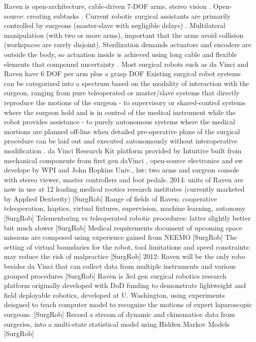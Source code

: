 Raven is open-architecture, cable-driven 7-DOF arms, stereo vision \citep{bib:raven_debride}.
Open-source: creating subtasks \citep{bib:raven_debride}.
Current robotic surgical assistants are primarily controlled by surgeons (master-slave with negligible delays) \citep{bib:raven_debride}.
Multilateral manipulation (with two or more arms), important that the arms avoid collision \citep{bib:raven_debride} (workspaces are rarely disjoint).
Sterilization demands actuators and encoders are outside the body, so actuation inside is achieved using long cable and flexible elements that compound uncertainty \citep{bib:raven_debride}.
Most surgical robots such as da Vinci and Raven have 6 DOF per arm plus a grasp DOF \citep{bib:raven_debride}
Existing surgical robot systems can be categorized into a spectrum based on the modality of interaction with the surgeon, ranging from pure teleoperated or master/slave systems that directly reproduce the motions of the surgeon - to supervisory or shared-control systems where the surgeon hold and is in control of the medical instrument while the robot provides assistance - to purely autonomous systems where the medical mortions are planned off-line when detailed pre-operative plans of the surgical procedure can be laid out and executed autonomously without interoperative modification \citep{bib:raven_debride}.
da Vinci Research Kit platform provided by Intuitive built from mechanical components from first gen daVinci \citep{bib:raven_observ}, open-source electronics and sw develope by WPI and John Hopkins Univ., hw: two arms and surgeon console with stereo viewer, master controllers and foot pedals.
2014: units of Raven are now in use at 12 leading medical rootics research institutes (currently marketed by Applied Dexterity) [SurgRob]
Range of fields of Raven: cooperative teleoperation, haptics, virtual fixtures, supervision, machine learning, autonomy [SurgRob]
Telementoring vs teleoperated robotic procedures: latter slightly better but much slower [SurgRob]
Medical requirements document of upcoming space missions are composed using experience gained from NEEMO [SurgRob]
The setting of virtual boundaries for the robot, tool limitations and speed constraints: may reduce the risk of malpractice [SurgRob]
2012: Raven will be the only robo besides da Vinci that can collect data from multiple instruments and various grouped procedures [SurgRob]
Raven is 3rd gen surgical robotics research platform originally developed with DoD funding to demonstrate lightweight and field deployable robotics, developed at U. Washington, using experiments deisgned to teach  computer model to recognize the motions of expert laparoscopic surgeons. [SurgRob] Record a stream of dynamic and ckinematioc data from surgeries, into a multi-state statistical model using Hidden Markov Models [SurgRob]

